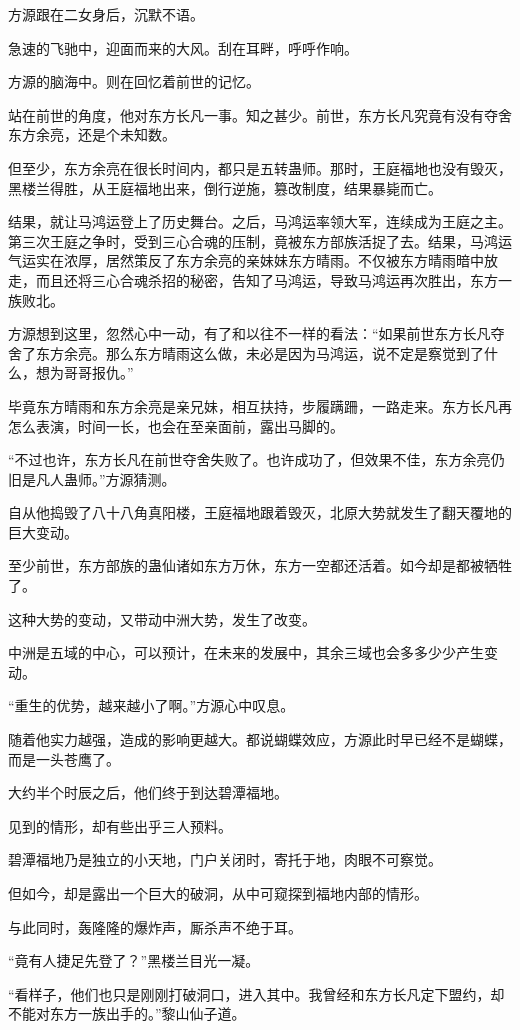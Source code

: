 \begin{this_body}
方源跟在二女身后，沉默不语。

急速的飞驰中，迎面而来的大风。刮在耳畔，呼呼作响。

方源的脑海中。则在回忆着前世的记忆。

站在前世的角度，他对东方长凡一事。知之甚少。前世，东方长凡究竟有没有夺舍东方余亮，还是个未知数。

但至少，东方余亮在很长时间内，都只是五转蛊师。那时，王庭福地也没有毁灭，黑楼兰得胜，从王庭福地出来，倒行逆施，篡改制度，结果暴毙而亡。

结果，就让马鸿运登上了历史舞台。之后，马鸿运率领大军，连续成为王庭之主。第三次王庭之争时，受到三心合魂的压制，竟被东方部族活捉了去。结果，马鸿运气运实在浓厚，居然策反了东方余亮的亲妹妹东方晴雨。不仅被东方晴雨暗中放走，而且还将三心合魂杀招的秘密，告知了马鸿运，导致马鸿运再次胜出，东方一族败北。

方源想到这里，忽然心中一动，有了和以往不一样的看法：“如果前世东方长凡夺舍了东方余亮。那么东方晴雨这么做，未必是因为马鸿运，说不定是察觉到了什么，想为哥哥报仇。”

毕竟东方晴雨和东方余亮是亲兄妹，相互扶持，步履蹒跚，一路走来。东方长凡再怎么表演，时间一长，也会在至亲面前，露出马脚的。

“不过也许，东方长凡在前世夺舍失败了。也许成功了，但效果不佳，东方余亮仍旧是凡人蛊师。”方源猜测。

自从他捣毁了八十八角真阳楼，王庭福地跟着毁灭，北原大势就发生了翻天覆地的巨大变动。

至少前世，东方部族的蛊仙诸如东方万休，东方一空都还活着。如今却是都被牺牲了。

这种大势的变动，又带动中洲大势，发生了改变。

中洲是五域的中心，可以预计，在未来的发展中，其余三域也会多多少少产生变动。

“重生的优势，越来越小了啊。”方源心中叹息。

随着他实力越强，造成的影响更越大。都说蝴蝶效应，方源此时早已经不是蝴蝶，而是一头苍鹰了。

大约半个时辰之后，他们终于到达碧潭福地。

见到的情形，却有些出乎三人预料。

碧潭福地乃是独立的小天地，门户关闭时，寄托于地，肉眼不可察觉。

但如今，却是露出一个巨大的破洞，从中可窥探到福地内部的情形。

与此同时，轰隆隆的爆炸声，厮杀声不绝于耳。

“竟有人捷足先登了？”黑楼兰目光一凝。

“看样子，他们也只是刚刚打破洞口，进入其中。我曾经和东方长凡定下盟约，却不能对东方一族出手的。”黎山仙子道。


\end{this_body}

